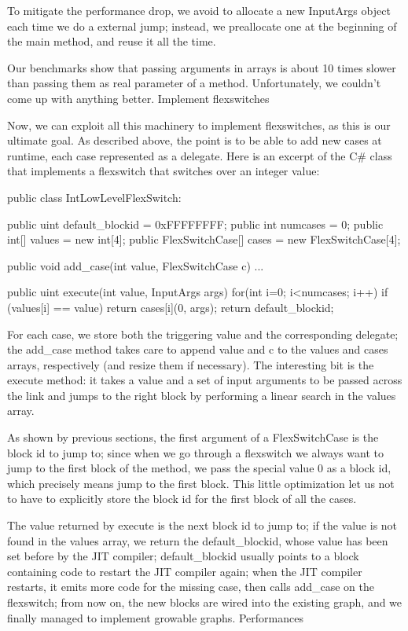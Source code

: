 {To mitigate the performance drop, we avoid to allocate a new InputArgs object each time we do a external jump; instead, we preallocate one at the beginning of the main method, and reuse it all the time.

Our benchmarks show that passing arguments in arrays is about 10 times slower than passing them as real parameter of a method. Unfortunately, we couldn't come up with anything better.
Implement flexswitches

Now, we can exploit all this machinery to implement flexswitches, as this is our ultimate goal. As described above, the point is to be able to add new cases at runtime, each case represented as a delegate. Here is an excerpt of the C# class that implements a flexswitch that switches over an integer value:

public class IntLowLevelFlexSwitch:
{
public uint default_blockid = 0xFFFFFFFF;
public int numcases = 0;
public int[] values = new int[4];
public FlexSwitchCase[] cases = new FlexSwitchCase[4];

public void add_case(int value, FlexSwitchCase c)
{
...
}

public uint execute(int value, InputArgs args)
{
for(int i=0; i<numcases; i++)
if (values[i] == value) {
 return cases[i](0, args);
}
return default_blockid;
}
}

For each case, we store both the triggering value and the corresponding delegate; the add_case method takes care to append value and c to the values and cases arrays, respectively (and resize them if necessary). The interesting bit is the execute method: it takes a value and a set of input arguments to be passed across the link and jumps to the right block by performing a linear search in the values array.

As shown by previous sections, the first argument of a FlexSwitchCase is the block id to jump to; since when we go through a flexswitch we always want to jump to the first block of the method, we pass the special value 0 as a block id, which precisely means jump to the first block. This little optimization let us not to have to explicitly store the block id for the first block of all the cases.

The value returned by execute is the next block id to jump to; if the value is not found in the values array, we return the default_blockid, whose value has been set before by the JIT compiler; default_blockid usually points to a block containing code to restart the JIT compiler again; when the JIT compiler restarts, it emits more code for the missing case, then calls add_case on the flexswitch; from now on, the new blocks are wired into the existing graph, and we finally managed to implement growable graphs.
Performances

}
